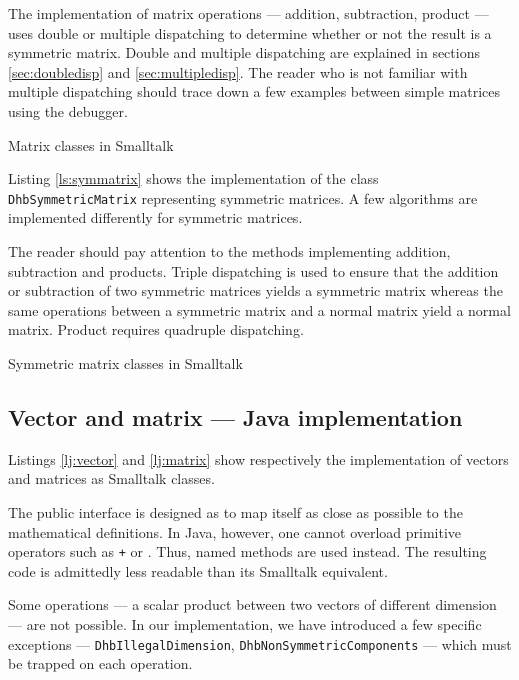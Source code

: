 \documentclass[twoside]{book}
\begin{document}
The implementation of matrix operations --- addition, subtraction,
product --- uses double or multiple dispatching to determine
whether or not the result is a symmetric matrix. Double and
multiple dispatching are explained in sections
\ref{sec:doubledisp} and \ref{sec:multipledisp}. The reader who is
not familiar with multiple dispatching should trace down a few
examples between simple matrices using the debugger.
\begin{listing} Matrix classes in Smalltalk \label{ls:matrix}

\end{listing}
Listing \ref{ls:symmatrix} shows the implementation of the class
{\tt DhbSymmetricMatrix} representing symmetric matrices. A few
algorithms are implemented differently for symmetric matrices.

The reader should pay attention to the methods implementing
addition, subtraction and products. Triple dispatching is used to
ensure that the addition or subtraction of two symmetric matrices
yields a symmetric matrix whereas the same operations between a
symmetric matrix and a normal matrix yield a normal matrix.
Product requires quadruple dispatching.
\begin{listing} Symmetric matrix classes in Smalltalk \label{ls:symmatrix}

\end{listing}

\subsection{Vector and matrix --- Java  implementation}
\label{sec:jlinearalgebra}   Listings \ref{lj:vector} and \ref{lj:matrix}
show respectively the implementation of vectors and matrices as
Smalltalk classes.

The public interface is designed as to map itself as close as
possible to the mathematical definitions. In Java, however, one
cannot overload primitive operators such as {\tt +} or {\tt *}.
Thus, named methods are used instead. The resulting code is
admittedly less readable than its Smalltalk equivalent.

Some operations --- a scalar product between two vectors of
different dimension \eg --- are not possible. In our
implementation, we have introduced a few specific exceptions ---
{\tt DhbIllegalDimension}, {\tt DhbNonSymmetricComponents}
--- which must be trapped on each operation.
\end{document}
